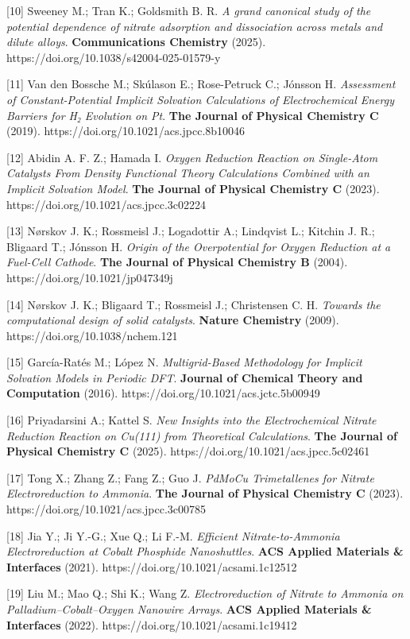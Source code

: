 \documentclass[
]{article}
\begin{document}
{[}10{]} Sweeney M.; Tran K.; Goldsmith B. R. \emph{A grand canonical
study of the potential dependence of nitrate adsorption and dissociation
across metals and dilute alloys}. \textbf{Communications Chemistry}
(2025). https://doi.org/10.1038/s42004-025-01579-y

{[}11{]} Van den Bossche M.; Skúlason E.; Rose-Petruck C.; Jónsson H.
\emph{Assessment of Constant-Potential Implicit Solvation Calculations
of Electrochemical Energy Barriers for H₂ Evolution on Pt}. \textbf{The
Journal of Physical Chemistry C} (2019).
https://doi.org/10.1021/acs.jpcc.8b10046

{[}12{]} Abidin A. F. Z.; Hamada I. \emph{Oxygen Reduction Reaction on
Single-Atom Catalysts From Density Functional Theory Calculations
Combined with an Implicit Solvation Model}. \textbf{The Journal of
Physical Chemistry C} (2023). https://doi.org/10.1021/acs.jpcc.3c02224

{[}13{]} Nørskov J. K.; Rossmeisl J.; Logadottir A.; Lindqvist L.;
Kitchin J. R.; Bligaard T.; Jónsson H. \emph{Origin of the Overpotential
for Oxygen Reduction at a Fuel-Cell Cathode}. \textbf{The Journal of
Physical Chemistry B} (2004). https://doi.org/10.1021/jp047349j

{[}14{]} Nørskov J. K.; Bligaard T.; Rossmeisl J.; Christensen C. H.
\emph{Towards the computational design of solid catalysts}.
\textbf{Nature Chemistry} (2009). https://doi.org/10.1038/nchem.121

{[}15{]} García-Ratés M.; López N. \emph{Multigrid-Based Methodology for
Implicit Solvation Models in Periodic DFT}. \textbf{Journal of Chemical
Theory and Computation} (2016). https://doi.org/10.1021/acs.jctc.5b00949

{[}16{]} Priyadarsini A.; Kattel S. \emph{New Insights into the
Electrochemical Nitrate Reduction Reaction on Cu(111) from Theoretical
Calculations}. \textbf{The Journal of Physical Chemistry C} (2025).
https://doi.org/10.1021/acs.jpcc.5c02461

{[}17{]} Tong X.; Zhang Z.; Fang Z.; Guo J. \emph{PdMoCu Trimetallenes
for Nitrate Electroreduction to Ammonia}. \textbf{The Journal of
Physical Chemistry C} (2023). https://doi.org/10.1021/acs.jpcc.3c00785

{[}18{]} Jia Y.; Ji Y.-G.; Xue Q.; Li F.-M. \emph{Efficient
Nitrate-to-Ammonia Electroreduction at Cobalt Phosphide Nanoshuttles}.
\textbf{ACS Applied Materials \& Interfaces} (2021).
https://doi.org/10.1021/acsami.1c12512

{[}19{]} Liu M.; Mao Q.; Shi K.; Wang Z. \emph{Electroreduction of
Nitrate to Ammonia on Palladium--Cobalt--Oxygen Nanowire Arrays}.
\textbf{ACS Applied Materials \& Interfaces} (2022).
https://doi.org/10.1021/acsami.1c19412
\end{document}
